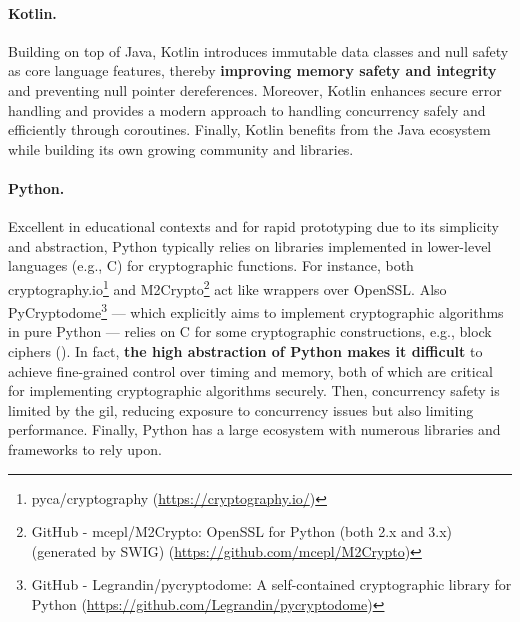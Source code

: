 \paragraph*{Kotlin.} Building on top of Java, Kotlin introduces immutable data classes and null safety as core language features, thereby \textbf{improving memory safety and integrity} and preventing null pointer dereferences. Moreover, Kotlin enhances secure error handling and provides a modern approach to handling concurrency safely and efficiently through coroutines. Finally, Kotlin benefits from the Java ecosystem while building its own growing community and libraries.

\paragraph*{Python.} Excellent in educational contexts and for rapid prototyping due to its simplicity and abstraction, Python typically relies on libraries implemented in lower-level languages (e.g., C) for cryptographic functions. For instance, both cryptography.io\footnote{pyca/cryptography (\url{https://cryptography.io/})} and M2Crypto\footnote{GitHub - mcepl/M2Crypto: OpenSSL for Python (both 2.x and 3.x) (generated by SWIG) (\url{https://github.com/mcepl/M2Crypto})} act like wrappers over OpenSSL. Also PyCryptodome\footnote{GitHub - Legrandin/pycryptodome: A self-contained cryptographic library for Python (\url{https://github.com/Legrandin/pycryptodome})} --- which explicitly aims to implement cryptographic algorithms in pure Python --- relies on C for some cryptographic constructions, e.g., block ciphers (). In fact, \textbf{the high abstraction of Python makes it difficult} to achieve fine-grained control over timing and memory, both of which are critical for implementing cryptographic algorithms securely. Then, concurrency safety is limited by the \gls{gil}, reducing exposure to concurrency issues but also limiting performance. Finally, Python has a large ecosystem with numerous libraries and frameworks to rely upon.

